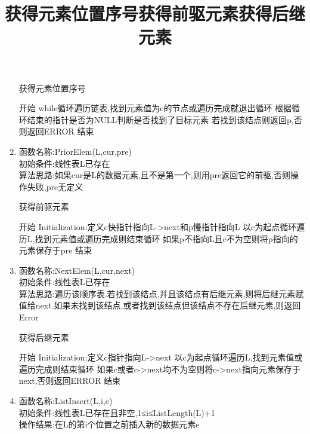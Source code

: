 \documentclass[supercite]{HustGraduPaper}
\theoremstyle{definition}
\begin{document}
\begin{enumerate}
	      \begin{algorithm}[htb]
		      \title{获得元素位置序号}
		      \caption{获得元素位置序号}
		      \begin{algorithmic}[1]
			      \State 开始
			      \State while循环遍历链表,找到元素值为e的节点或遍历完成就退出循环
			      \State 根据循环结束的指针是否为NULL判断是否找到了目标元素
			      \State 若找到该结点则返回p,否则返回ERROR
			      \State 结束
		      \end{algorithmic}\label{L7}
	      \end{algorithm}
	\item 函数名称:PriorElem(L,cur,pre)\\
	      初始条件:线性表L已存在\\
	      算法思路:如果cur是L的数据元素,且不是第一个,则用pre返回它的前驱,否则操作失败,pre无定义
	      \begin{algorithm}[htb]
		      \title{获得前驱元素}
		      \caption{获得前驱元素}
		      \begin{algorithmic}[1]
			      \State 开始
			      \State Initialization:定义c快指针指向L->next和p慢指针指向L
			      \State 以c为起点循环遍历L,找到元素值或遍历完成则结束循环
			      \State 如果p不指向L且c不为空则将p指向的元素保存于pre
			      \State 结束
		      \end{algorithmic}\label{L8}
	      \end{algorithm}
	\item 函数名称:NextElem(L,cur,next)\\
	      初始条件:线性表L已存在\\
	      算法思路:遍历该顺序表.若找到该结点,并且该结点有后继元素,则将后继元素赋值给next.如果未找到该结点,或者找到该结点但该结点不存在后继元素,则返回Error
	      \begin{algorithm}[htb]
		      \title{获得后继元素}
		      \caption{获得后继元素}
		      \begin{algorithmic}[1]
			      \State 开始
			      \State Initialization:定义c指针指向L->next
			      \State 以c为起点循环遍历L,找到元素值或遍历完成则结束循环
			      \State 如果c或者c->next均不为空则将c->next指向元素保存于next,否则返回ERROR
			      \State 结束
		      \end{algorithmic}\label{L9}
	      \end{algorithm}
	\item 函数名称:ListInsert(L,i,e)\\
	      初始条件:线性表L已存在且非空,1≤i≤ListLength(L)+1\\
	      操作结果:在L的第i个位置之前插入新的数据元素e\\

\end{enumerate}
\end{document}
